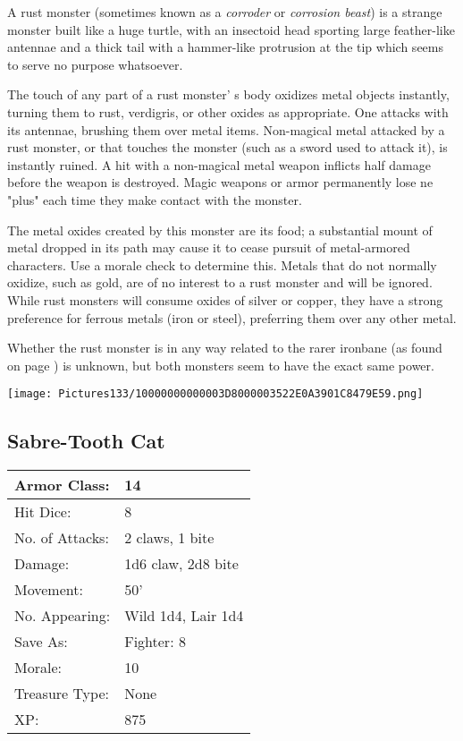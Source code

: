 \documentclass[a4paper,twoside,openany,10pt]{book}
\begin{document}
\begin{multicols}{2}
A rust monster (sometimes known as a \emph{corroder} or \emph{corrosion beast}) is a strange monster built like a huge turtle, with an insectoid head sporting large feather-like antennae and a thick tail with a hammer-like protrusion at the tip which seems to serve no purpose whatsoever.

The touch of any part of a rust monster' s body oxidizes metal objects instantly, turning them to rust, verdigris, or other oxides as appropriate. One attacks with its antennae, brushing them over metal items. Non-magical metal attacked by a rust monster, or that touches the monster (such as a sword used to attack it), is instantly ruined. A hit with a non-magical metal weapon inflicts half damage before the weapon is destroyed. Magic weapons or armor permanently lose ne "plus" each time they make contact with the monster. 

The metal oxides created by this monster are its food; a substantial mount of metal dropped in its path may cause it to cease pursuit of metal-armored characters. Use a morale check to determine this. Metals that do not normally oxidize, such as gold, are of no interest to a rust monster and will be ignored. While rust monsters will consume oxides of silver or copper, they have a strong preference for ferrous metals (iron or steel), preferring them over any other metal.

Whether the rust monster is in any way related to the rarer ironbane (as found on page \hyperlink{ironbane}{\pageref{ironbane}}) is unknown, but both monsters seem to have the exact same power.

\begin{center} \texttt{[image: Pictures133/10000000000003D8000003522E0A3901C8479E59.png]} \end{center}

\subsection*{Sabre-Tooth Cat}\label{sabre-tooth-cat}

\begin{tabularx}{0.50\textwidth}{@{}lX@{}}
Armor Class: & 14 \\\hline
Hit Dice: & 8 \\\hline
No. of Attacks: & 2 claws, 1 bite \\\hline
Damage: & 1d6 claw, 2d8 bite \\\hline
Movement: & 50' \\\hline
No. Appearing: & Wild 1d4, Lair 1d4 \\\hline
Save As: & Fighter: 8 \\\hline
Morale: & 10 \\\hline
Treasure Type: & None \\\hline
XP: & 875 \\\hline
\end{tabularx}\medskip


\end{multicols}
\end{document}
